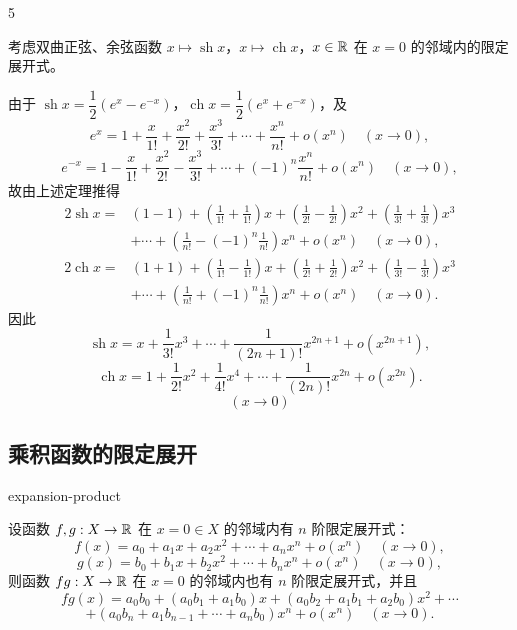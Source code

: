 \begin{sourceexample}{5}

考虑双曲正弦、余弦函数 $x\longmapsto\operatorname{sh}x$，$x\longmapsto\operatorname{ch}x$，$x\in\mathbb{R}$ 在 $x=0$ 的邻域内的限定展开式。

由于 $\operatorname{sh}x=\dfrac{1}{2}(e^x-e^{-x})$，$\operatorname{ch}x=\dfrac{1}{2}(e^x+e^{-x})$，及
\[e^x=1+\frac{x}{1!}+\frac{x^2}{2!}+\frac{x^3}{3!}+\cdots+\frac{x^n}{n!}+o(x^n)\quad(x\to0),\]
\[e^{-x}=1-\frac{x}{1!}+\frac{x^2}{2!}-\frac{x^3}{3!}+\cdots+(-1)^n\frac{x^n}{n!}+o(x^n)\quad(x\to0),\]
故由上述定理推得
\[\begin{aligned}
2\operatorname{sh}x={}&(1-1)+\left(\frac{1}{1!}+\frac{1}{1!}\right)x+\left(\frac{1}{2!}-\frac{1}{2!}\right)x^2+\left(\frac{1}{3!}+\frac{1}{3!}\right)x^3\\
&+\cdots+\left(\frac{1}{n!}-(-1)^n\frac{1}{n!}\right)x^n+o(x^n)\quad(x\to0),
\end{aligned}\]
\[\begin{aligned}
2\operatorname{ch}x={}&(1+1)+\left(\frac{1}{1!}-\frac{1}{1!}\right)x+\left(\frac{1}{2!}+\frac{1}{2!}\right)x^2+\left(\frac{1}{3!}-\frac{1}{3!}\right)x^3\\
&+\cdots+\left(\frac{1}{n!}+(-1)^n\frac{1}{n!}\right)x^n+o(x^n)\quad(x\to0).
\end{aligned}\]
因此
\[\operatorname{sh}x=x+\frac{1}{3!}x^3+\cdots+\frac{1}{(2n+1)!}x^{2n+1}+o(x^{2n+1}),\]
\[\operatorname{ch}x=1+\frac{1}{2!}x^2+\frac{1}{4!}x^4+\cdots+\frac{1}{(2n)!}x^{2n}+o(x^{2n}).\]
\[(x\to0)\]

\end{sourceexample}

\subsection{乘积函数的限定展开}

\begin{mythm}{}{expansion-product}

设函数 $f,g:X\to\mathbb{R}$ 在 $x=0\in X$ 的邻域内有 $n$ 阶限定展开式：
\[f(x)=a_0+a_1x+a_2x^2+\cdots+a_nx^n+o(x^n)\quad(x\to0),\]
\[g(x)=b_0+b_1x+b_2x^2+\cdots+b_nx^n+o(x^n)\quad(x\to0),\]
则函数 $fg:X\to\mathbb{R}$ 在 $x=0$ 的邻域内也有 $n$ 阶限定展开式，并且
\[fg(x)=a_0b_0+(a_0b_1+a_1b_0)x+(a_0b_2+a_1b_1+a_2b_0)x^2+\cdots\]
\[+(a_0b_n+a_1b_{n-1}+\cdots+a_nb_0)x^n+o(x^n)\quad(x\to0).\]

\end{mythm}

